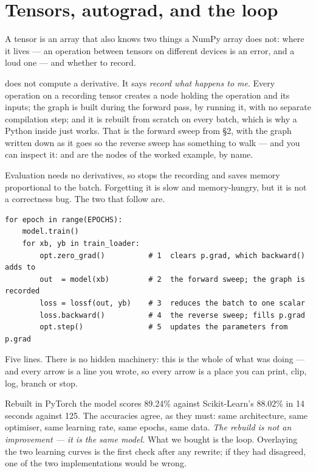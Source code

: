 \documentclass[11pt,a4paper]{article}
\begin{document}
\section{Tensors, autograd, and the loop}

A tensor is an array that also knows two things a NumPy array does not: where
it lives --- an operation between tensors on different devices is an error, and
a loud one --- and whether to record.

 does not compute a derivative. It says \emph{record what
happens to me}. Every operation on a recording tensor creates a node holding
the operation and its inputs; the graph is built during the forward pass, by
running it, with no separate compilation step; and it is rebuilt from scratch
on every batch, which is why a Python  inside  just
works. That is the forward sweep from \S2, with the graph written down as it
goes so the reverse sweep has something to walk --- and you can inspect it:
 and  are the nodes of the
worked example, by name.

Evaluation needs no derivatives, so  stops the recording
and saves memory proportional to the batch. Forgetting it is slow and
memory-hungry, but it is not a correctness bug. The two that follow are.

\begin{center}
\small
\begin{verbatim}
for epoch in range(EPOCHS):
    model.train()
    for xb, yb in train_loader:
        opt.zero_grad()          # 1  clears p.grad, which backward() adds to
        out  = model(xb)         # 2  the forward sweep; the graph is recorded
        loss = lossf(out, yb)    # 3  reduces the batch to one scalar
        loss.backward()          # 4  the reverse sweep; fills p.grad
        opt.step()               # 5  updates the parameters from p.grad
\end{verbatim}
\end{center}

Five lines. There is no hidden machinery: this is the whole of what
 was doing --- and every arrow is a line you wrote, so every arrow
is a place you can print, clip, log, branch or stop.

Rebuilt in PyTorch the model scores 89.24\% against Scikit-Learn's 88.02\% in
14 seconds against 125. The accuracies agree, as they must: same architecture,
same optimiser, same learning rate, same epochs, same data. \emph{The rebuild
is not an improvement --- it is the same model.} What we bought is the loop.
Overlaying the two learning curves is the first check after any rewrite; if
they had disagreed, one of the two implementations would be wrong.
\end{document}
